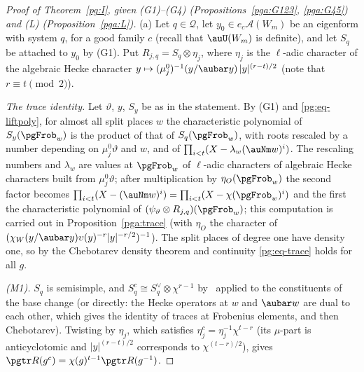 \documentclass[10pt]{amsart}
\theoremstyle{definition}
\theoremstyle{remark}
\begin{document}
\begin{proof}[Proof of Theorem~\ref{pg:I}, given {\rm(G1)--(G4)} (Propositions~\ref{pga:G123}, \ref{pga:G45}) and {\rm(L)} (Proposition~\ref{pga:L})]
(a) Let $q\in\mathcal Q$, let $y_0\in e_c\mathcal A(W_m)$ be an eigenform with system $q$, for a
good family $c$ (recall that $\auU(W_m)$ is definite), and let $S_q$ be attached to $y_0$ by (G1).
Put $R_{j,q}=S_q\otimes\eta_j$, where $\eta_j$ is the $\ell$-adic character of the algebraic Hecke
character $y\mapsto(\mu_j^0)^{-1}(y/\aubar y)\,|y|^{(r-t)/2}$ (note that $r\equiv t\pmod2$).

\emph{The trace identity.} Let $\vartheta$, $y$, $S_y$ be as in the statement. By (G1) and
\eqref{pg:eq-liftpoly}, for almost all split places $w$ the characteristic polynomial of
$S_y(\pgFrob_w)$ is the product of that of $S_q(\pgFrob_w)$, with roots rescaled by a number
depending on $\mu_j^0\vartheta$ and $w$, and of $\prod_{i<t}(X-\lambda_w(\auNm w)^i)$. The
rescaling numbers and $\lambda_w$ are values at $\pgFrob_w$ of $\ell$-adic characters of algebraic
Hecke characters built from $\mu_j^0\vartheta$; after multiplication by $\eta_O(\pgFrob_w)$ the
second factor becomes $\prod_{i<t}(X-(\auNm w)^i)=\prod_{i<t}(X-\chi(\pgFrob_w)^i)$ and the first
the characteristic polynomial of $(\psi_\vartheta\otimes R_{j,q})(\pgFrob_w)$; this computation is
carried out in Proposition~\ref{pga:trace} (with $\eta_O$ the character of $(\chi_W(y/\aubar y)\upsilon(y)^{-r}|y|^{-r/2})^{-1}$). The split
places of degree one have density one, so by the Chebotarev density theorem and continuity
\eqref{pg:eq-trace} holds for all $g$.

\emph{{\rm(M1)}.} $S_q$ is semisimple, and $S_q^c\cong S_q^\vee\otimes\chi^{r-1}$
by~\cite[Theorem~2.1.1]{BLGGT} applied to the constituents of the base change (or directly: the
Hecke operators at $w$ and $\aubar w$ are dual to each other, which gives the identity of traces
at Frobenius elements, and then Chebotarev). Twisting by $\eta_j$, which satisfies
$\eta_j^c=\eta_j^{-1}\chi^{t-r}$ (its $\mu$-part is anticyclotomic and $|y|^{(r-t)/2}$
corresponds to $\chi^{(t-r)/2}$), gives $\pgtr R(g^c)=\chi(g)^{t-1}\pgtr R(g^{-1})$.


\end{proof}
\end{document}
